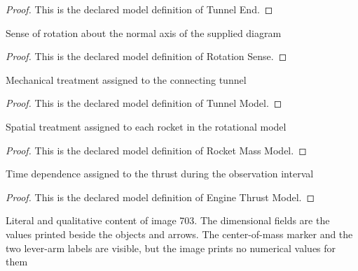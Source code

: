 \begin{proof}
  This is the declared model definition of Tunnel End.
\end{proof}
\begin{definition}
  \label{def:physics:phyx-mini-0703:phyxminiproblems-problemphyxmini0703-rotationsense}
  Sense of rotation about the normal axis of the supplied diagram
\end{definition}
\begin{proof}
  This is the declared model definition of Rotation Sense.
\end{proof}
\begin{definition}
  \label{def:physics:phyx-mini-0703:phyxminiproblems-problemphyxmini0703-tunnelmodel}
  Mechanical treatment assigned to the connecting tunnel
\end{definition}
\begin{proof}
  This is the declared model definition of Tunnel Model.
\end{proof}
\begin{definition}
  \label{def:physics:phyx-mini-0703:phyxminiproblems-problemphyxmini0703-rocketmassmodel}
  Spatial treatment assigned to each rocket in the rotational model
\end{definition}
\begin{proof}
  This is the declared model definition of Rocket Mass Model.
\end{proof}
\begin{definition}
  \label{def:physics:phyx-mini-0703:phyxminiproblems-problemphyxmini0703-enginethrustmodel}
  Time dependence assigned to the thrust during the observation interval
\end{definition}
\begin{proof}
  This is the declared model definition of Engine Thrust Model.
\end{proof}
\begin{definition}
  \label{def:physics:phyx-mini-0703:phyxminiproblems-problemphyxmini0703-dockedrocketsfigure}
  Literal and qualitative content of image 703. The dimensional fields are the values printed beside the objects and arrows. The center-of-mass marker and the two lever-arm labels are visible, but the image prints no numerical values for them
\end{definition}
